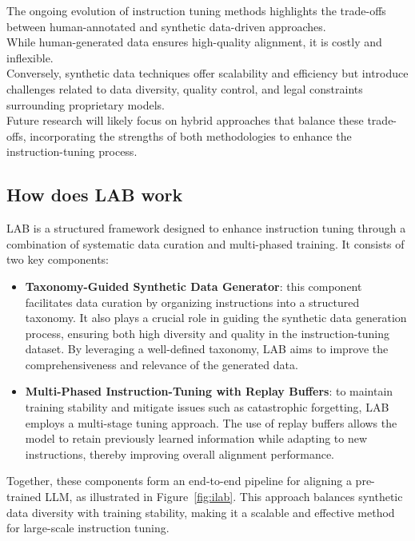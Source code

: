 \documentclass[12pt]{article}
\begin{document}
The ongoing evolution of instruction tuning methods highlights the trade-offs between human-annotated and synthetic data-driven approaches.\\
While human-generated data ensures high-quality alignment, it is costly and inflexible.\\
Conversely, synthetic data techniques offer scalability and efficiency but introduce challenges related to data diversity, quality control, and legal constraints surrounding proprietary models.\\
Future research will likely focus on hybrid approaches that balance these trade-offs, incorporating the strengths of both methodologies to enhance the instruction-tuning process.

\subsection{How does LAB work}
LAB is a structured framework designed to enhance instruction tuning through a combination of systematic data curation and multi-phased training. It consists of two key components:
\begin{itemize}
    \item \textbf{Taxonomy-Guided Synthetic Data Generator}: this component facilitates data curation by organizing instructions into a structured taxonomy. It also plays a crucial role in guiding the synthetic data generation process, ensuring both high diversity and quality in the instruction-tuning dataset. By leveraging a well-defined taxonomy, LAB aims to improve the comprehensiveness and relevance of the generated data.
    \item \textbf{Multi-Phased Instruction-Tuning with Replay Buffers}: to maintain training stability and mitigate issues such as catastrophic forgetting, LAB employs a multi-stage tuning approach. The use of replay buffers allows the model to retain previously learned information while adapting to new instructions, thereby improving overall alignment performance.
\end{itemize}
Together, these components form an end-to-end pipeline for aligning a pre-trained LLM, as illustrated in Figure~\ref{fig:ilab}. This approach balances synthetic data diversity with training stability, making it a scalable and effective method for large-scale instruction tuning.\\
\end{document}
